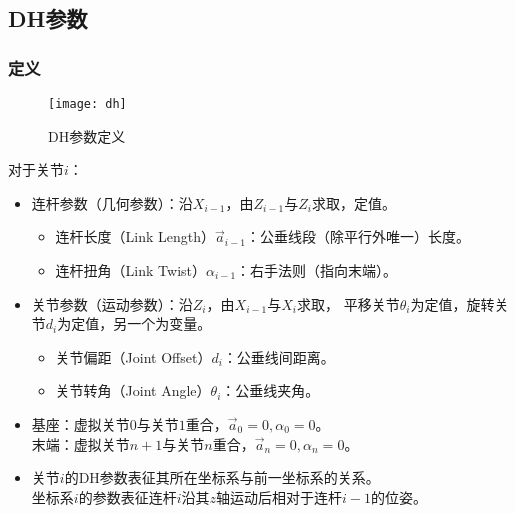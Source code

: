 \documentclass[
12pt, %
a4paper, 
oneside, %
headinclude,footinclude, %
]{scrartcl}
\begin{document}
\subsection{DH参数}
\subsubsection{定义}
\begin{figure}[H]
\centering 
\texttt{[image: dh]} 
\caption[DH参数]{DH参数定义}
\end{figure}

对于关节$ i $：
\begin{itemize}
\item 连杆参数（几何参数）：沿$ X_{i - 1} $，由$ Z_{i - 1} $与$ Z_i $求取，定值。
\begin{itemize}
\item 连杆长度（Link Length）$ \vec a_{i - 1}  $：公垂线段（除平行外唯一）长度。
\item 连杆扭角（Link Twist）$ \alpha_{i - 1} $：右手法则（指向末端）。
\end{itemize}
\item 关节参数（运动参数）：沿$ Z_i $，由$ X_{i - 1} $与$ X_i $求取，
平移关节$ \theta_i $为定值，旋转关节$ d_i $为定值，另一个为变量。
\begin{itemize}
\item 关节偏距（Joint Offset）$ d_i $：公垂线间距离。
\item 关节转角（Joint Angle）$ \theta_i $：公垂线夹角。
\end{itemize}
\item 基座：虚拟关节$ 0 $与关节$ 1 $重合，$ \vec a_0 = 0, \alpha_0 = 0 $。 \\
末端：虚拟关节$ n + 1 $与关节$ n $重合，$ \vec a_n = 0, \alpha_n = 0 $。
\item 关节$ i $的DH参数表征其所在坐标系与前一坐标系的关系。 \\
坐标系$ i $的参数表征连杆$ i $沿其$ z $轴运动后相对于连杆$ i - 1 $的位姿。
\end{itemize}
\end{document}
